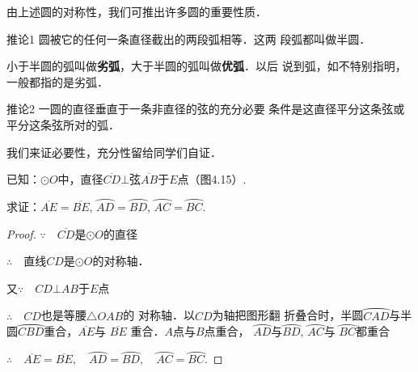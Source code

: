 \begin{figure}[htp]\centering
    \begin{minipage}[t]{0.48\textwidth}
    \centering
    \caption{}
    \end{minipage}
    \begin{minipage}[t]{0.48\textwidth}
    \centering
    \caption{}
    \end{minipage}
    \end{figure}

由上述圆的对称性，我们可推出许多圆的重要性质．

\begin{blk}
    {推论1} 圆被它的任何一条直径截出的两段弧相等．这两
段弧都叫做半圆．
\end{blk}

小于半圆的弧叫做\textbf{劣弧}，大于半圆的弧叫做\textbf{优弧}．以后
说到弧，如不特别指明，一般都指的是劣弧．

\begin{blk}
    {推论2} 一圆的直径垂直于一条非直径的弦的充分必要
条件是这直径平分这条弦或平分这条弦所对的弧．
\end{blk}

我们来证必要性，充分性留给同学们自证．

已知：$\odot O$中，直径$\overline{CD}\bot $弦$\overline{AB}$于$E$点（图4.15）.

求证：$\overline{AE}=\overline{BE}$, $\wideparen{AD}=\wideparen{BD}$, $\wideparen{AC}=\wideparen{BC}$.

\begin{proof}
$\because\quad \overline{CD}$是$\odot O$的直径

$\therefore\quad $直线$CD$是$\odot O$的对称轴．

又$\because\quad CD\bot AB$于$E$点

$\therefore\quad CD$也是等腰$\triangle OAB$的
对称轴．以$CD$为轴把图形翻
折叠合时，半圆$\wideparen{CAD}$与半圆$\wideparen{CBD}$重合，$\overline{AE}$与
$\overline{BE}$
重合．$A$点与$B$点重合，
$\wideparen{AD}$与$\wideparen{BD}$, $\wideparen{AC}$与
$\wideparen{BC}$都重合

$\therefore\quad \overline{AE}=\overline{BE},\quad 
\wideparen{AD}=\wideparen{BD},\quad 
\wideparen{AC}=\wideparen{BC}$.
\end{proof}

